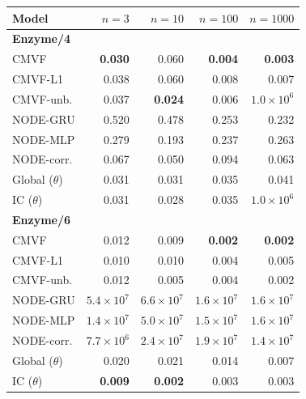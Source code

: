 \begin{tabular*}{\linewidth}{@{\extracolsep{\fill}}lrrrr}
\toprule
Model & $n=3$ & $n=10$ & $n=100$ & $n=1000$ \\
\midrule
\multicolumn{5}{l}{\textbf{Enzyme/4}} \\
CMVF & \textbf{0.030} & 0.060 & \textbf{0.004} & \textbf{0.003} \\
CMVF-L1 & 0.038 & 0.060 & 0.008 & 0.007 \\
CMVF-unb. & 0.037 & \textbf{0.024} & 0.006 & $1.0\!\times\!10^{6}$ \\
NODE-GRU & 0.520 & 0.478 & 0.253 & 0.232 \\
NODE-MLP & 0.279 & 0.193 & 0.237 & 0.263 \\
NODE-corr. & 0.067 & 0.050 & 0.094 & 0.063 \\
Global ($\theta$) & 0.031 & 0.031 & 0.035 & 0.041 \\
IC ($\theta$) & 0.031 & 0.028 & 0.035 & $1.0\!\times\!10^{6}$ \\
\midrule
\multicolumn{5}{l}{\textbf{Enzyme/6}} \\
CMVF & 0.012 & 0.009 & \textbf{0.002} & \textbf{0.002} \\
CMVF-L1 & 0.010 & 0.010 & 0.004 & 0.005 \\
CMVF-unb. & 0.012 & 0.005 & 0.004 & 0.002 \\
NODE-GRU & $5.4\!\times\!10^{7}$ & $6.6\!\times\!10^{7}$ & $1.6\!\times\!10^{7}$ & $1.6\!\times\!10^{7}$ \\
NODE-MLP & $1.4\!\times\!10^{7}$ & $5.0\!\times\!10^{7}$ & $1.5\!\times\!10^{7}$ & $1.6\!\times\!10^{7}$ \\
NODE-corr. & $7.7\!\times\!10^{6}$ & $2.4\!\times\!10^{7}$ & $1.9\!\times\!10^{7}$ & $1.4\!\times\!10^{7}$ \\
Global ($\theta$) & 0.020 & 0.021 & 0.014 & 0.007 \\
IC ($\theta$) & \textbf{0.009} & \textbf{0.002} & 0.003 & 0.003 \\
\bottomrule
\end{tabular*}
